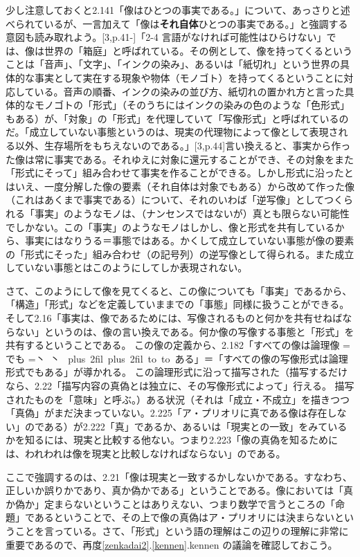 \documentclass[11pt,a4paper]{jsbook}
\newcommand{\ruby}[2]{%
    \leavevmode
    \setbox0=\hbox{#1}%
    \setbox1=\hbox{\tiny #2}%
    \ifdim\wd0>\wd1 \dimen0=\wd0 \else \dimen0=\wd1 \fi
    \hbox{%
    \kanjiskip=0pt plus 2fil
    \xkanjiskip=0pt plus 2fil
    \vbox{%
    \hbox to \dimen0{%
    \tiny \hfil#2\hfil}%
    \nointerlineskip
    \hbox to \dimen0{\mathstrut\hfil#1\hfil}}}}
\begin{document}
少し注意しておくと2.141「像はひとつの事実である。」について、あっさりと述べられているが、一言加えて「像は{\bf それ自体}ひとつの事実である。」と強調する意図も読み取れよう。[3,p.41-]「2-4 言語がなければ可能性はひらけない」では、像は世界の「箱庭」と呼ばれている。その例として、像を持ってくるということは「音声」、「文字」、「インクの染み」、あるいは「紙切れ」という世界の具体的な事実として実在する現象や物体（モノゴト）を持ってくるということに対応している。音声の順番、インクの染みの並び方、紙切れの置かれ方と言った具体的なモノゴトの「形式」（そのうちにはインクの染みの色のような「色形式」もある）が、「対象」の「形式」を代理していて「写像形式」と呼ばれているのだ。「成立していない事態というのは、現実の代理物によって像として表現される以外、生存場所をもちえないのである。」[3,p.44]言い換えると、事実から作った像は常に事実である。それゆえに対象に還元することができ、その対象をまた「形式にそって」組み合わせて事実を作ることができる。しかし形式に沿ったとはいえ、一度分解した像の要素（それ自体は対象でもある）から改めて作った像（これはあくまで事実である）について、それのいわば「逆写像」としてつくられる「事実」のようなモノは、（ナンセンスではないが）真とも限らない可能性でしかない。この「事実」のようなモノはしかし、像と形式を共有しているから、事実にはなりうる＝事態ではある。かくして成立していない事態が像の要素の「形式にそった」組み合わせ（の記号列）の逆写像として得られる。また成立していない事態とはこのようにしてしか表現されない。

さて、このようにして像を見てくると、この像についても「事実」であるから、「構造」「形式」などを定義していままでの「事態」同様に扱うことができる。そして2.16「事実は、像であるためには、写像されるものと何かを共有せねばならない」というのは、像の言い換えである。何か像の写像する事態と「形式」を共有するということである。
この像の定義から、2.182「すべての像は論理像\ruby{でも}{丶 丶}ある」＝「すべての像の写像形式は論理形式でもある」が導かれる。
この論理形式に沿って描写された（描写するだけなら、2.22「描写内容の真偽とは独立に、その写像形式によって」行える。 描写されたものを「意味」と呼ぶ。）ある状況（それは「成立・不成立」を描きつつ「真偽」がまだ決まっていない。2.225「ア・プリオリに真である像は存在しない」のである）が2.222「真」であるか、あるいは「現実との一致」をみているかを知るには、現実と比較する他ない。つまり2.223「像の真偽を知るためには、われわれは像を現実と比較しなければならない」のである。

ここで強調するのは、2.21「像は現実と一致するかしないかである。すなわち、正しいか誤りかであり、真か偽かである」ということである。像においては「真か偽か」定まらないということはありえない、つまり数学で言うところの「命題」であるということで、その上で像の真偽はア・プリオリには決まらないということを言っている。さて、「形式」という語の理解はこの辺りの理解に非常に重要であるので、再度\ref{zenkadai2}.\ref{kennen}.kennen の議論を確認しておこう。
\end{document}
